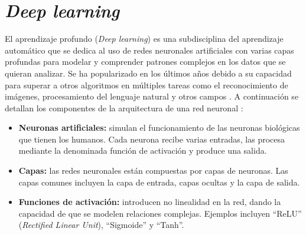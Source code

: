 \section{\textit{Deep learning}}
El aprendizaje profundo (\textit{Deep learning}) es una subdisciplina del aprendizaje automático que se dedica al uso de redes neuronales artificiales con varias capas profundas para modelar y comprender patrones complejos en los datos que se quieran analizar. Se ha popularizado en los últimos años debido a su capacidad para superar a otros algoritmos en múltiples tareas como el reconocimiento de imágenes, procesamiento del lenguaje natural y otros campos \cite{deep-learning}. A continuación se detallan los componentes de la arquitectura de una red neuronal \cite{arquitectura-red}:

\begin{itemize}
    \item \textbf{Neuronas artificiales:} simulan el funcionamiento de las neuronas biológicas que tienen los humanos. Cada neurona recibe varias entradas, las procesa mediante la denominada función de activación y produce una salida.
    \item \textbf{Capas:} las redes neuronales están compuestas por capas de neuronas. Las capas comunes incluyen la capa de entrada, capas ocultas y la capa de salida.
    \item \textbf{Funciones de activación:} introducen no linealidad en la red, dando la capacidad de que se modelen relaciones complejas. Ejemplos incluyen ``ReLU'' (\textit{Rectified Linear Unit}), ``Sigmoide'' y ``Tanh''.
\end{itemize}

